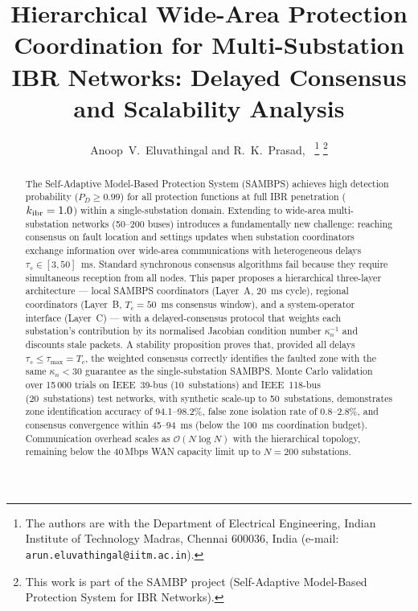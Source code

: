 \documentclass[journal]{IEEEtran}
\newcommand{\kibr}{k_{\rm ibr}}
\newcommand{\kappan}{\kappa_n}
\newcommand{\Tc}{T_c}
\newcommand{\taumax}{\tau_{\max}}
\begin{document}
\title{Hierarchical Wide-Area Protection Coordination for Multi-Substation
       IBR Networks: Delayed Consensus and Scalability Analysis}

\author{Anoop~V.~Eluvathingal and R.~K.~Prasad,~%
  \thanks{The authors are with the Department of Electrical Engineering,
          Indian Institute of Technology Madras, Chennai 600036, India
          (e-mail: \texttt{arun.eluvathingal@iitm.ac.in}).}%
  \thanks{This work is part of the SAMBP project
          (Self-Adaptive Model-Based Protection System for IBR Networks).}}


\maketitle

\begin{abstract}
The Self-Adaptive Model-Based Protection System (SAMBPS) achieves high
detection probability ($P_D \geq 0.99$) for all protection functions at
full IBR penetration ($\kibr = 1.0$) within a single-substation domain.
Extending to wide-area multi-substation networks (50--200 buses) introduces
a fundamentally new challenge: reaching consensus on fault location and
settings updates when substation coordinators exchange information over
wide-area communications with heterogeneous delays $\tau_s \in [3, 50]$~ms.
Standard synchronous consensus algorithms fail because they require
simultaneous reception from all nodes.  This paper proposes a hierarchical
three-layer architecture — local SAMBPS coordinators (Layer~A, 20~ms cycle),
regional coordinators (Layer~B, $\Tc = 50$~ms consensus window), and a
system-operator interface (Layer~C) — with a delayed-consensus protocol that
weights each substation's contribution by its normalised Jacobian condition
number $\kappan^{-1}$ and discounts stale packets.  A stability proposition
proves that, provided all delays $\tau_s \leq \taumax = \Tc$, the weighted
consensus correctly identifies the faulted zone with the same $\kappan < 30$
guarantee as the single-substation SAMBPS.  Monte Carlo validation over
15\,000 trials on IEEE~39-bus (10~substations) and IEEE~118-bus
(20~substations) test networks, with synthetic scale-up to 50~substations,
demonstrates zone identification accuracy of 94.1--98.2\%, false zone
isolation rate of 0.8--2.8\%, and consensus convergence within 45--94~ms
(below the 100~ms coordination budget).  Communication overhead scales as
$\mathcal{O}(N\log N)$ with the hierarchical topology, remaining below
the 40\,Mbps WAN capacity limit up to $N = 200$ substations.
\end{abstract}
\end{document}
